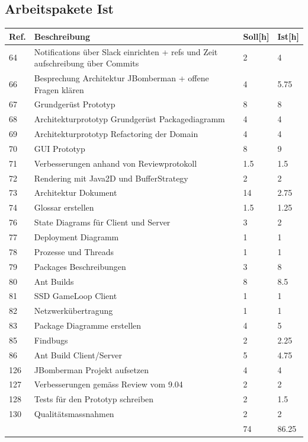 \documentclass[11pt]{scrartcl}
\begin{document}
  \subsection{Arbeitspakete Ist}
  \begin{tabularx} {\linewidth}{lXll}
    \bf{Ref.}  & \bf{Beschreibung} & \bf{Soll[h]}  & \bf{Ist[h]}\\
    \hline
    64 & Notifications über Slack einrichten + refs und Zeit aufschreibung über Commits & 2 & 4 \\
    66 & Besprechung Architektur JBomberman + offene Fragen klären & 4 & 5.75\\
    67 &  Grundgerüst Prototyp & 8 & 8\\
    68 & Architekturprototyp Grundgerüst Packagediagramm & 4 & 4\\
    69 &  Architekturprototyp Refactoring der Domain & 4 & 4\\
    70 & GUI Prototyp & 8 & 9\\
    71 & 	Verbesserungen anhand von Reviewprotokoll & 1.5 & 1.5\\
    72 & Rendering mit Java2D und BufferStrategy & 2 & 2\\
    73 & Architektur Dokument & 14 & 2.75\\
    74 & Glossar erstellen  & 1.5 & 1.25\\
    76 & State Diagrams für Client und Server & 3 & 2\\
    77 & Deployment Diagramm & 1 & 1\\
    78 & 	Prozesse und Threads & 1 & 1\\
    79 & 	Packages Beschreibungen & 3 & 8\\
    80 & Ant Builds & 8 & 8.5\\
    81 & SSD GameLoop Client & 1 & 1\\
    82 & Netzwerkübertragung & 1 & 1\\
    83 & Package Diagramme erstellen & 4 & 5\\
    85 & 	Findbugs & 2 & 2.25\\
    86 & Ant Build Client/Server & 5 & 4.75\\
    126 & JBomberman Projekt aufsetzen & 4 & 4\\
    127 & Verbesserungen gemäss Review vom 9.04 & 2 & 2\\
    128 & Tests für den Prototyp schreiben & 2 & 1.5 \\
    130 & Qualitätsmassnahmen	& 2 & 2\\
    \hline
    & & 74 & 86.25
    \end{tabularx}
\end{document}
